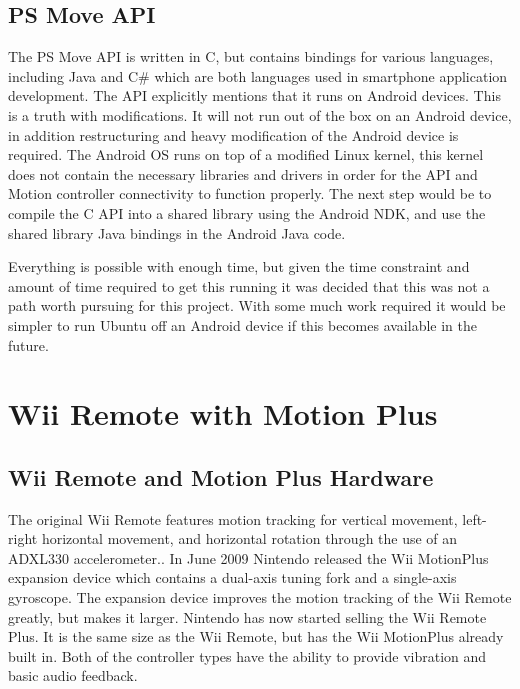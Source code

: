 \documentclass[11pt,twoside,a4paper]{report}
\begin{document}
\subsection{PS Move API}

The PS Move API \cite{PSMoveAPI} is written in C, but contains bindings for various languages, including Java and C\# which are both languages used in smartphone application development. The API explicitly mentions that it runs on Android devices. This is a truth with modifications. It will not run out of the box on an Android device, in addition restructuring and heavy modification of the Android device is required.  The Android OS runs on top of a modified Linux kernel, this kernel does not contain the necessary libraries and drivers in order for the API and Motion controller connectivity to function properly. %
The next step would be to compile the C API into a shared library using the Android NDK, and use the shared library Java bindings in the Android Java code.

Everything is possible with enough time, but given the time constraint and amount of time required to get this running it was decided that this was not a path worth pursuing for this project. With some much work required it would be simpler to run Ubuntu off an Android device if this becomes available in the future. \cite{ubuntuAndroid}

\section{Wii Remote with Motion Plus}

\subsection{Wii Remote and Motion Plus Hardware}
The original Wii Remote features motion tracking for vertical movement, left-right horizontal movement, and horizontal rotation through the use of an ADXL330 accelerometer.\cite{wiiAccelerometer}.
In June 2009 Nintendo released the Wii MotionPlus expansion device which contains a dual-axis tuning fork and a single-axis gyroscope\cite{wiiMotionPlus}.
The expansion device improves the motion tracking of the Wii Remote greatly, but makes it larger. Nintendo has now started selling the Wii Remote Plus. It is the same size as the Wii Remote, but has the Wii MotionPlus already built in. Both of the controller types have the ability to provide vibration and basic audio feedback.
\end{document}
